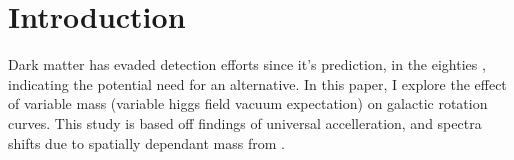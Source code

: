 \chapter{Introduction}


Dark matter has evaded detection efforts since it's prediction, in the eighties \cite{rubinRotationalProperties211980, rubinEXTENDEDROTATIONCURVES, shiForceMetricMass2021}, indicating the potential need for an alternative. In this paper, I explore the effect of variable mass (variable higgs field vacuum expectation) on galactic rotation curves. This study is based off findings of universal accelleration, and spectra shifts due to spatially dependant mass from \cite{shiForceMetricMass2021}. 
